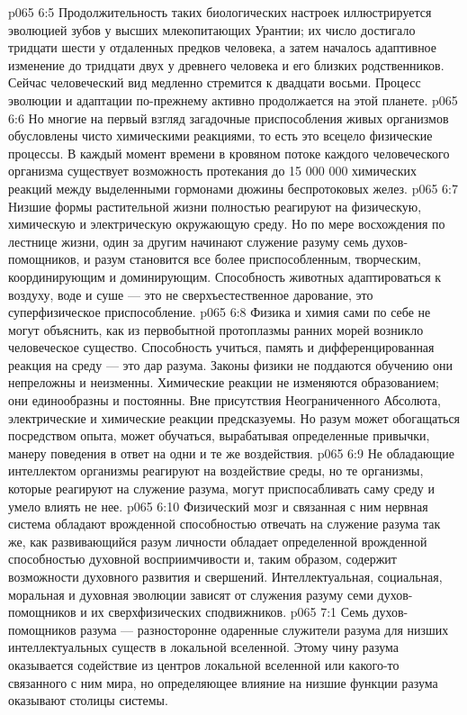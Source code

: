 \vs p065 6:5 Продолжительность таких биологических настроек иллюстрируется эволюцией зубов у высших млекопитающих Урантии; их число достигало тридцати шести у отдаленных предков человека, а затем началось адаптивное изменение до тридцати двух у древнего человека и его близких родственников. Сейчас человеческий вид медленно стремится к двадцати восьми. Процесс эволюции и адаптации по\hyp{}прежнему активно продолжается на этой планете.
\vs p065 6:6 Но многие на первый взгляд загадочные приспособления живых организмов обусловлены чисто химическими реакциями, то есть это всецело физические процессы. В каждый момент времени в кровяном потоке каждого человеческого организма существует возможность протекания до 15 000 000 химических реакций между выделенными гормонами дюжины беспротоковых желез.
\vs p065 6:7 \pc Низшие формы растительной жизни полностью реагируют на физическую, химическую и электрическую окружающую среду. Но по мере восхождения по лестнице жизни, один за другим начинают служение разуму семь духов\hyp{}помощников, и разум становится все более приспособленным, творческим, координирующим и доминирующим. Способность животных адаптироваться к воздуху, воде и суше --- это не сверхъестественное дарование, это суперфизическое приспособление.
\vs p065 6:8 Физика и химия сами по себе не могут объяснить, как из первобытной протоплазмы ранних морей возникло человеческое существо. Способность учиться, память и дифференцированная реакция на среду --- это дар разума. Законы физики не поддаются обучению они непреложны и неизменны. Химические реакции не изменяются образованием; они единообразны и постоянны. Вне присутствия Неограниченного Абсолюта, электрические и химические реакции предсказуемы. Но разум может обогащаться посредством опыта, может обучаться, вырабатывая определенные привычки, манеру поведения в ответ на одни и те же воздействия.
\vs p065 6:9 Не обладающие интеллектом организмы реагируют на воздействие среды, но те организмы, которые реагируют на служение разума, могут приспосабливать саму среду и умело влиять не нее.
\vs p065 6:10 Физический мозг и связанная с ним нервная система обладают врожденной способностью отвечать на служение разума так же, как развивающийся разум личности обладает определенной врожденной способностью духовной восприимчивости и, таким образом, содержит возможности духовного развития и свершений. Интеллектуальная, социальная, моральная и духовная эволюции зависят от служения разуму семи духов\hyp{}помощников и их сверхфизических сподвижников.
\vs p065 7:1 Семь духов\hyp{}помощников разума --- разносторонне одаренные служители разума для низших интеллектуальных существ в локальной вселенной. Этому чину разума оказывается содействие из центров локальной вселенной или какого\hyp{}то связанного с ним мира, но определяющее влияние на низшие функции разума оказывают столицы системы.

